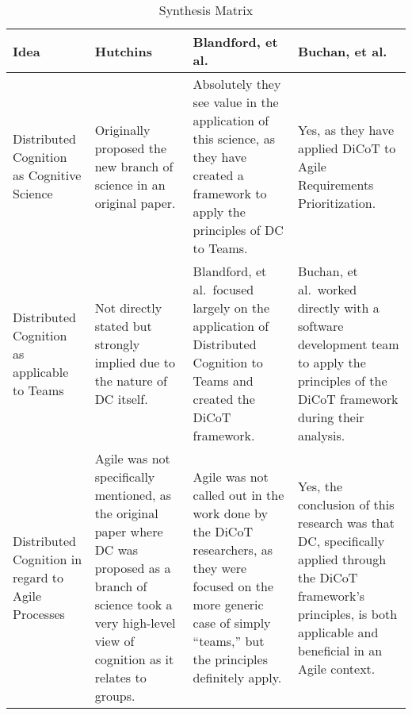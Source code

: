 \begin{table}%
\caption{Synthesis Matrix}\label{tab:synthesis-matrix}
\begin{minipage}{\columnwidth}
\begin{center}
\begin{tabular}{|p{0.75in}|p{1.5in}|p{1.5in}|p{1.5in}|}
\hline
Idea & Hutchins\cite{hutchins2000distributed} & Blandford, et al.\cite{blandford2005dicot} & Buchan, et al.\cite{buchan2020applying} \\
\hline
Distributed Cognition as Cognitive Science &
Originally proposed the new branch of science in an original paper. &
Absolutely they see value in the application of this science, as they have created a framework to apply the principles of DC to Teams. &
Yes, as they have applied DiCoT to Agile Requirements Prioritization.
\\
\hline
Distributed Cognition as applicable to Teams &
Not directly stated but strongly implied due to the nature of DC itself. &
Blandford, et al.\ focused largely on the application of Distributed Cognition to Teams and created the DiCoT framework. &
Buchan, et al.\ worked directly with a software development team to apply the principles of the DiCoT framework during their analysis.
\\
\hline
Distributed Cognition in regard to Agile Processes &
Agile was not specifically mentioned, as the original paper where DC was proposed as a branch of science took a very high-level view of cognition as it relates to groups. &
Agile was not called out in the work done by the DiCoT researchers, as they were focused on the more generic case of simply ``teams,'' but the principles definitely apply. &
Yes, the conclusion of this research was that DC, specifically applied through the DiCoT framework's principles, is both applicable and beneficial in an Agile context.
\\
\hline
\end{tabular}
\end{center}
\bigskip\centering
\end{minipage}
\end{table}%

